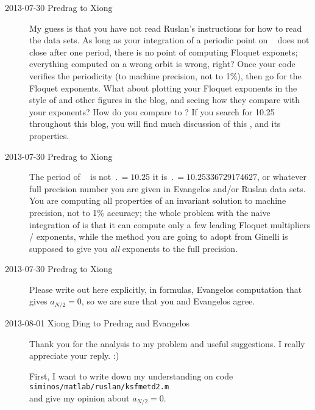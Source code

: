 \begin{description}
\item[2013-07-30 Predrag to Xiong] My guess is that you have not read
    Ruslan's instructions for how to read the data sets. As long as
    your integration of a periodic point on \po\  does not
    close after one period, there is no point of computing Floquet
    exponets; everything computed on a wrong orbit is wrong, right?
    Once your code verifies the periodicity (to machine precision, not
    to 1\%), then go for the Floquet exponents. What about plotting
    your Floquet exponents in the style of  and
    other figures in the blog, and seeing how they compare with your
    exponents? How do you compare to ?
    If you search for 10.25 throughout this blog, you will find much
    discussion of this \po, and its properties.

\item[2013-07-30 Predrag to Xiong] The period of \po\
     is not $\period{}=10.25$ it is
    $\period{}=10.25336729174627$, or whatever full precision number
    you are given in Evangelos and/or Ruslan data sets. You are
    computing all properties of an invariant solution to machine
    precision, not to 1\% accuracy; the whole problem with the naive
    integration of \refeq{XD-JacobianEq} is that it can compute only a
    few leading Floquet multipliers / exponents, while the method you
    are going to adopt from Ginelli \etal\rf{GiChLiPo12} is supposed to
    give you {\em all} exponents to the full precision.

\item[2013-07-30 Predrag to Xiong] Please write out here explicitly, in
    formulas, Evangelos computation that gives $a_{N/2}=0$, so we are
    sure that you and Evangelos agree.

\item[2013-08-01 Xiong Ding to Predrag and Evangelos] Thank you for the analysis to my
problem and useful suggestions. I really appreciate your reply. :)

First, I want to write down my understanding on code \\
\texttt{siminos/matlab/ruslan/ksfmetd2.m} \\
and give my opinion about $a_{N/2}=0$.


\end{description}
